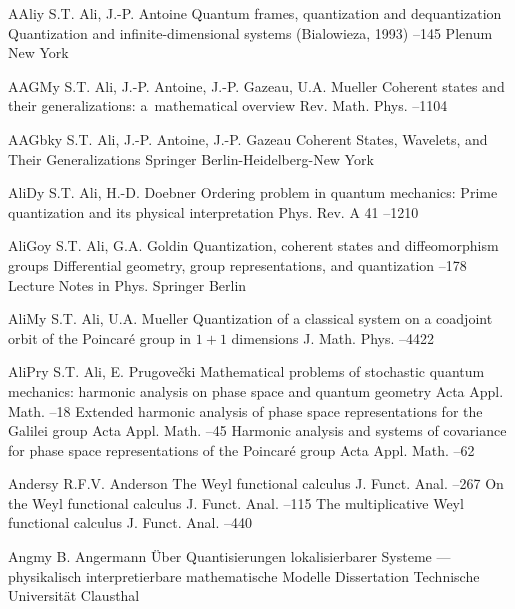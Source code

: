 \documentclass[12pt]{amsart}
\numberwithin{equation}{section}
\theoremstyle{remark}
\newcommand{\by}{\mathbf y}
\begin{document}
\begin{thebibliography}{199}
 AAli\by{ S.T. Ali, J.-P. Antoine \paper Quantum frames, quantization and
dequantization \inbook Quantization and infinite-dimensional systems
(Bialowieza, 1993) --145 \publ Plenum \publaddr New York }

 AAGM\by{ S.T. Ali, J.-P. Antoine, J.-P. Gazeau, U.A. Mueller \paper
Coherent states and their generalizations: a~mathematical overview \jour Rev.
Math. Phys.   --1104}

 AAGbk\by{ S.T. Ali, J.-P. Antoine, J.-P. Gazeau \book Coherent States,
Wavelets, and Their Generalizations \publ Springer \publaddr
Berlin-Heidelberg-New York }

 AliD\by{ S.T. Ali, H.-D. Doebner \paper Ordering problem in quantum
mechanics: Prime quantization and its physical interpretation \jour Phys.
Rev. \vol A 41  --1210}

 AliGo\by{ S.T. Ali, G.A. Goldin \paper Quantization, coherent states and
diffeomorphism groups \inbook Differential geometry, group representations, and
quantization --178 \bookinfo Lecture Notes in Phys.  \publ
Springer \publaddr Berlin }

 AliM\by{ S.T. Ali, U.A. Mueller \paper Quantization of a classical system
on a coadjoint orbit of the Poincar\'e group in $1+1$ dimensions
\jour J. Math. Phys.   --4422}

 AliPr\by{ S.T. Ali, E. Prugove\v cki \paper Mathematical problems of
stochastic quantum mechanics: harmonic analysis on phase space and quantum
geometry \jour Acta Appl. Math.   --18 \moreref \paper
Extended harmonic analysis of phase space representations for the Galilei group
\jour Acta Appl. Math.   --45 \moreref \paper Harmonic
analysis and systems of covariance for phase space representations of the
Poincar\'e group \jour Acta Appl. Math.   --62}

 Anders\by{ R.F.V. Anderson \paper The Weyl functional calculus \jour J.
Funct. Anal.   --267 \moreref \paper On the Weyl
functional calculus \jour J. Funct. Anal.   --115
\moreref \paper The multiplicative Weyl functional calculus \jour J. Funct.
Anal.   --440}

 Angm\by{ B. Angermann \book \"Uber Quantisierungen lokalisierbarer
Systeme --- physikalisch interpretierbare mathematische Modelle \bookinfo
Dissertation \publ Technische Universit\"at Clausthal }


\end{thebibliography}
\end{document}

